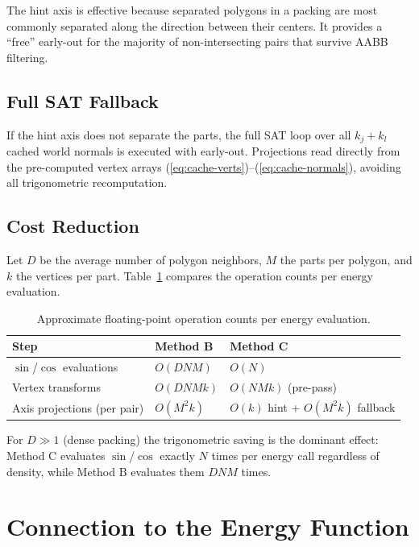 The hint axis is effective because separated polygons in a packing
are most commonly separated along the direction between their centers.
It provides a ``free'' early-out for the majority of non-intersecting
pairs that survive AABB filtering.

\subsection{Full SAT Fallback}

If the hint axis does not separate the parts, the full SAT loop over
all $k_j + k_l$ cached world normals is executed with early-out.
Projections read directly from the pre-computed vertex arrays
(\ref{eq:cache-verts})--(\ref{eq:cache-normals}), avoiding all
trigonometric recomputation.

\subsection{Cost Reduction}

Let $D$ be the average number of polygon neighbors, $M$ the parts per
polygon, and $k$ the vertices per part.
Table~\ref{tab:cost} compares the operation counts per energy evaluation.

\begin{table}[h]
\centering
\caption{Approximate floating-point operation counts per energy evaluation.}
\label{tab:cost}
\begin{tabular}{lll}
\toprule
Step & Method B & Method C \\
\midrule
$\sin$/$\cos$ evaluations & $O(DNM)$ & $O(N)$ \\
Vertex transforms & $O(DNMk)$ & $O(NMk)$ (pre-pass) \\
Axis projections (per pair) & $O(M^2 k)$ & $O(k)$ hint + $O(M^2 k)$ fallback \\
\bottomrule
\end{tabular}
\end{table}

For $D \gg 1$ (dense packing) the trigonometric saving is the dominant
effect: Method C evaluates $\sin$/$\cos$ exactly $N$ times per energy
call regardless of density, while Method B evaluates them $DNM$ times.

\section{Connection to the Energy Function}
\label{sec:energy-collision}

